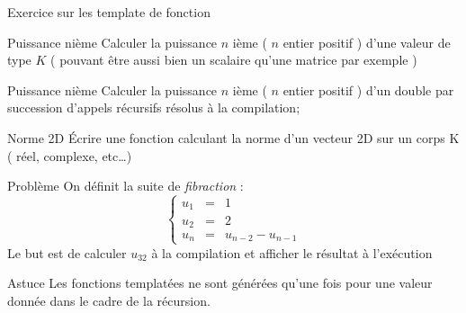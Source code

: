 \documentclass[handout,10pt]{beamer}
\begin{document}
\begin{frame}[fragile]{Exercice sur les template de fonction}
\tiny
\begin{exampleblock}{Puissance nième}
Calculer la puissance $n$ ième ( $n$ entier positif ) d'une valeur de type $K$ ( pouvant être aussi bien un scalaire qu'une matrice par exemple )
\end{exampleblock}

\begin{exampleblock}{Puissance nième}
Calculer la puissance $n$ ième ( $n$ entier positif ) d'un double par succession d'appels récursifs résolus à la compilation;
\end{exampleblock}

\begin{exampleblock}{Norme 2D}
Écrire une fonction calculant la norme d'un vecteur 2D sur un corps K ( réel, complexe, etc\ldots)
\end{exampleblock}

\begin{exampleblock}{Problème}
On définit la suite de \textsl{fibraction} :
\[
\left\{
\begin{array}{rcl}
u_{1} & = & 1 \\
u_{2} & = & 2 \\
u_{n} & = & u_{n-2} - u_{n-1}
\end{array}
\right.
\]
Le but est de calculer $u_{32}$ à la compilation et afficher le résultat à l'exécution
\begin{block}{Astuce}
Les fonctions templatées ne sont générées qu'une fois pour une valeur donnée dans le cadre de la récursion.
\end{block}
\end{exampleblock}
\end{frame}
\end{document}
